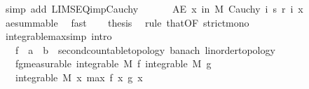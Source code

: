 \begin{isabellebody}
\ {\isacharparenleft}{\kern0pt}simp\ add{\isacharcolon}{\kern0pt}\ LIMSEQ{\isacharunderscore}{\kern0pt}imp{\isacharunderscore}{\kern0pt}Cauchy{\isacharparenright}{\kern0pt}\isanewline
\ \ \isacommand{{\isacharbraceright}{\kern0pt}}\isamarkupfalse%
\isanewline
\ \ \isamarkupfalse%
\ {\isachardoublequoteopen}AE\ x\ in\ M{\isachardot}{\kern0pt}\ Cauchy\ {\isacharparenleft}{\kern0pt}{\isasymlambda}i{\isachardot}{\kern0pt}\ s\ {\isacharparenleft}{\kern0pt}r\ i{\isacharparenright}{\kern0pt}\ x{\isacharparenright}{\kern0pt}{\isachardoublequoteclose}\ \isamarkupfalse%
\ ae{\isacharunderscore}{\kern0pt}summable\ \isamarkupfalse%
\ fast\isanewline
\ \ \isamarkupfalse%
\ {\isacharquery}{\kern0pt}thesis\ \isamarkupfalse%
\ {\isacharparenleft}{\kern0pt}rule\ that{\isacharbrackleft}{\kern0pt}OF\ strict{\isacharunderscore}{\kern0pt}mono{\isacharparenleft}{\kern0pt}{}{\isacharparenright}{\kern0pt}{\isacharbrackright}{\kern0pt}{\isacharparenright}{\kern0pt}\isanewline
{}\isamarkupfalse%
%
\endisatagproof
{\isafoldproof}%
%
\isadelimproof
%
\endisadelimproof
%
\isadelimdocument
%
\endisadelimdocument
%
\isatagdocument
%
\isamarkuptrue%
%
\endisatagdocument
{\isafolddocument}%
%
\isadelimdocument
%
\endisadelimdocument
{}\isamarkupfalse%
\ integrable{\isacharunderscore}{\kern0pt}max{\isacharbrackleft}{\kern0pt}simp{\isacharcomma}{\kern0pt}\ intro{\isacharbrackright}{\kern0pt}{\isacharcolon}{\kern0pt}\isanewline
\ \ \ f\ {\isacharcolon}{\kern0pt}{\isacharcolon}{\kern0pt}\ {\isachardoublequoteopen}{\isacharprime}{\kern0pt}a\ {\isasymRightarrow}\ {\isacharprime}{\kern0pt}b\ {\isacharcolon}{\kern0pt}{\isacharcolon}{\kern0pt}\ {\isacharbraceleft}{\kern0pt}second{\isacharunderscore}{\kern0pt}countable{\isacharunderscore}{\kern0pt}topology{\isacharcomma}{\kern0pt}\ banach{\isacharcomma}{\kern0pt}\ linorder{\isacharunderscore}{\kern0pt}topology{\isacharbraceright}{\kern0pt}{\isachardoublequoteclose}\isanewline
\ \ \ fg{\isacharbrackleft}{\kern0pt}measurable{\isacharbrackright}{\kern0pt}{\isacharcolon}{\kern0pt}\ {\isachardoublequoteopen}integrable\ M\ f{\isachardoublequoteclose}\ {\isachardoublequoteopen}integrable\ M\ g{\isachardoublequoteclose}\isanewline
\ \ \ {\isachardoublequoteopen}integrable\ M\ {\isacharparenleft}{\kern0pt}{\isasymlambda}x{\isachardot}{\kern0pt}\ max\ {\isacharparenleft}{\kern0pt}f\ x{\isacharparenright}{\kern0pt}\ {\isacharparenleft}{\kern0pt}g\ x{\isacharparenright}{\kern0pt}{\isacharparenright}{\kern0pt}{\isachardoublequoteclose}\isanewline

\end{isabellebody}
